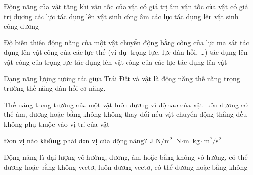 \begin{ex}
	Động năng của vật tăng khi
	\choice
	{vận tốc của vật có giá trị âm}
	{vận tốc của vật có giá trị dương}
	{các lực tác dụng lên vật sinh công âm}
	{\True các lực tác dụng lên vật sinh công dương}
\end{ex}
\begin{ex}
	Độ biến thiên động năng của một vật chuyển động bằng
	\choice
	{công của lực ma sát tác dụng lên vật}
	{công của các lực thế (ví dụ: trọng lực, lực đàn hồi, \dots) tác dụng lên vật}
	{công của trọng lực tác dụng lên vật}
	{\True công của các lực tác dụng lên vật}
\end{ex}
\begin{ex}
	Dạng năng lượng tương tác giữa Trái Đất và vật là	
	\choice
	{động năng}
	{\True thế năng trọng trường}
	{thế năng đàn hồi}
	{cơ năng.}
\end{ex}
\begin{ex}
	Thế năng trọng trường của một vật
	\choice
	{luôn dương vì độ cao của vật luôn dương}
	{\True có thể âm, dương hoặc bằng không}
	{không thay đổi nếu vật chuyển động thẳng đều}
	{không phụ thuộc vào vị trí của vật}
\end{ex}
\begin{ex}
		Đơn vị nào \textbf{không} phải đơn vị của động năng?
	\choice
	{$\si{\joule}$}
	{\True $\si{\newton/\meter^2}$}
	{$\si{\newton\cdot\meter}$}
	{$\si{\kilogram\cdot\meter^2/\second^2}$}
	\loigiai{}
\end{ex}
\begin{ex}
	Động năng là đại lượng
	\choice
	{vô hướng, dương, âm hoặc bằng không}
	{\True vô hướng, có thể dương hoặc bằng không}
	{vectơ, luôn dương}
	{vectơ, có thể dương hoặc bằng không}
	\loigiai{}
\end{ex}
